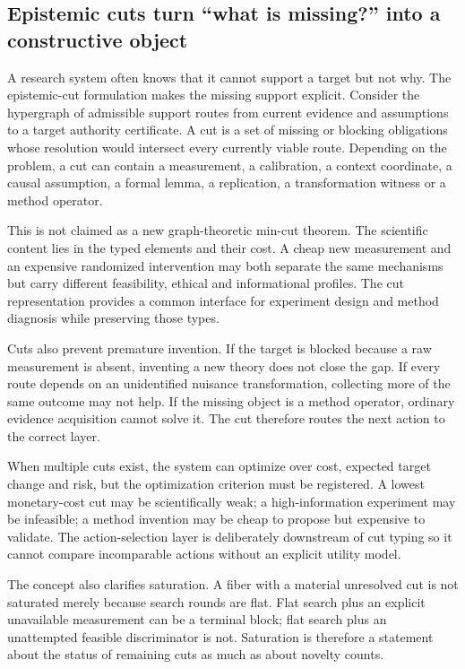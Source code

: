 \subsection{Epistemic cuts turn ``what is missing?'' into a constructive object}

A research system often knows that it cannot support a target but not why. The epistemic-cut formulation makes the missing support explicit. Consider the hypergraph of admissible support routes from current evidence and assumptions to a target authority certificate. A cut is a set of missing or blocking obligations whose resolution would intersect every currently viable route. Depending on the problem, a cut can contain a measurement, a calibration, a context coordinate, a causal assumption, a formal lemma, a replication, a transformation witness or a method operator.

This is not claimed as a new graph-theoretic min-cut theorem. The scientific content lies in the typed elements and their cost. A cheap new measurement and an expensive randomized intervention may both separate the same mechanisms but carry different feasibility, ethical and informational profiles. The cut representation provides a common interface for experiment design and method diagnosis while preserving those types.

Cuts also prevent premature invention. If the target is blocked because a raw measurement is absent, inventing a new theory does not close the gap. If every route depends on an unidentified nuisance transformation, collecting more of the same outcome may not help. If the missing object is a method operator, ordinary evidence acquisition cannot solve it. The cut therefore routes the next action to the correct layer.

When multiple cuts exist, the system can optimize over cost, expected target change and risk, but the optimization criterion must be registered. A lowest monetary-cost cut may be scientifically weak; a high-information experiment may be infeasible; a method invention may be cheap to propose but expensive to validate. The action-selection layer is deliberately downstream of cut typing so it cannot compare incomparable actions without an explicit utility model.

The concept also clarifies saturation. A fiber with a material unresolved cut is not saturated merely because search rounds are flat. Flat search plus an explicit unavailable measurement can be a terminal block; flat search plus an unattempted feasible discriminator is not. Saturation is therefore a statement about the status of remaining cuts as much as about novelty counts.

